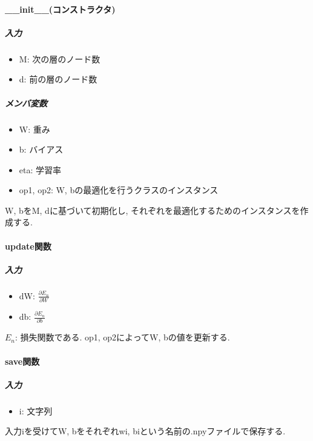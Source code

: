 \documentclass[a4j, titlepage]{jarticle}
\begin{document}
        \paragraph*{\_\_init\_\_(コンストラクタ)}
            \subparagraph*{入力}
            \begin{itemize}
                \item M: 次の層のノード数
                \item d: 前の層のノード数
            \end{itemize}
            \subparagraph*{メンバ変数}
            \begin{itemize}
                \item W: 重み
                \item b: バイアス
                \item eta: 学習率
                \item op1, op2: W, bの最適化を行うクラスのインスタンス
            \end{itemize}
            W, bをM, dに基づいて初期化し, それぞれを最適化するためのインスタンスを作成する.
        \paragraph*{update関数}
            \subparagraph*{入力}
            \begin{itemize}
                \item dW: \(\displaystyle \frac{\partial E_n}{\partial W}\)
                \item db: \(\displaystyle \frac{\partial E_n}{\partial b}\)
            \end{itemize}
            $E_n$: 損失関数である.
            op1, op2によってW, bの値を更新する.
        \paragraph*{save関数}
            \subparagraph*{入力}
            \begin{itemize}
                \item i: 文字列
            \end{itemize}
            入力iを受けてW, bをそれぞれwi, biという名前の.npyファイルで保存する.
\end{document}
